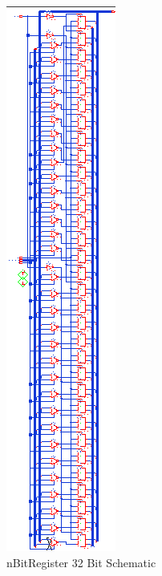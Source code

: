 \documentclass[11pt]{article}
\begin{document}
	
	\begin{figure}[H] 
		\centering 
		\includegraphics[width=0.7\linewidth]{"Pictures/nBitRegister 32-Bit Schematic"}
		\caption{nBitRegister 32 Bit Schematic} 
		\label{fig:nBitRegister-32-Bit-Schematic} 
	\end{figure}
	
\end{document}
